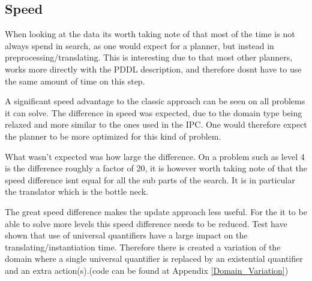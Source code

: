 			
		\subsection{Speed}
			When looking at the data its worth taking note of that most of the time is not always spend in search, as one would expect for a planner, but instead in preprocessing/translating. This is interesting due to that most other planners, works more directly with the PDDL description, and therefore dosnt have to use the same amount of time on this step.
		
			A significant speed advantage to the classic approach can be seen on all problems it can solve. The difference in speed was expected, due to the domain type being relaxed and more similar to the ones used in the IPC. One would therefore expect the planner to be more optimized for this kind of problem.
			

			What wasn't expected was how large the difference. On a problem such as level 4 is the difference roughly a factor of 20, it is however worth taking note of that the speed difference isnt equal for all the sub parts of the search. It is in particular the translator which is the bottle neck. 
			
			The great speed difference makes the update approach less useful. For the it to be able to solve more levels this speed difference needs to be reduced. Test have shown that use of universal quantifiers have a large impact on the translating/instantiation time. Therefore there is created a variation of the domain where a single universal quantifier is replaced by an existential quantifier and an extra action(s).(code can be found at Appendix \ref{Domain_Variation})


